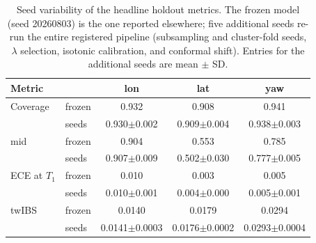 \begin{table}[!t]
\caption{Seed variability of the headline holdout metrics. The frozen model (seed 20260803) is the one reported elsewhere; five additional seeds re-run the entire registered pipeline (subsampling and cluster-fold seeds, $\lambda$ selection, isotonic calibration, and conformal shift). Entries for the additional seeds are mean $\pm$ SD.}
\label{tab:seeds}
\centering
\footnotesize
\setlength{\tabcolsep}{3pt}
\begin{tabular}{llccc}
\toprule
Metric & & lon & lat & yaw \\
\midrule
Coverage & frozen & 0.932 & 0.908 & 0.941 \\
 & seeds & 0.930$\pm$0.002 & 0.909$\pm$0.004 & 0.938$\pm$0.003 \\
\quad mid & frozen & 0.904 & 0.553 & 0.785 \\
 & seeds & 0.907$\pm$0.009 & 0.502$\pm$0.030 & 0.777$\pm$0.005 \\
ECE at $T_1$ & frozen & 0.010 & 0.003 & 0.005 \\
 & seeds & 0.010$\pm$0.001 & 0.004$\pm$0.000 & 0.005$\pm$0.001 \\
twIBS & frozen & 0.0140 & 0.0179 & 0.0294 \\
 & seeds & 0.0141$\pm$0.0003 & 0.0176$\pm$0.0002 & 0.0293$\pm$0.0004 \\
\bottomrule
\end{tabular}
\end{table}
